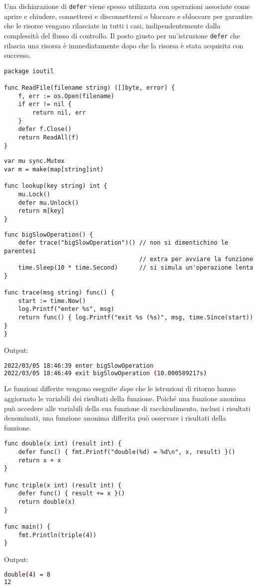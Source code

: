 \documentclass[../../thesis.tex]{subfiles}
\begin{document}
    Una dichiarazione di \verb"defer" viene spesso utilizzata con operazioni associate come aprire e chiudere, connettersi e disconnettersi o bloccare e sbloccare per garantire che le risorse vengano rilasciate in tutti i casi, indipendentemente dalla complessità del flusso di controllo.
    Il posto giusto per un'istruzione \verb"defer" che rilascia una risorsa è immediatamente dopo che la risorsa è stata acquisita con successo.
    \begin{lstlisting}[frame = single, label = {lst:lstlisting4-8.1}]
package ioutil

func ReadFile(filename string) ([]byte, error) {
    f, err := os.Open(filename)
    if err != nil {
        return nil, err
    }
    defer f.Close()
    return ReadAll(f)
}
    \end{lstlisting}
    \begin{lstlisting}[frame = single, label = {lst:lstlisting4-8.2}]
var mu sync.Mutex
var m = make(map[string]int)

func lookup(key string) int {
    mu.Lock()
    defer mu.Unlock()
    return m[key]
}
    \end{lstlisting}
    \begin{lstlisting}[frame = single, label = {lst:lstlisting4-8.3}]
func bigSlowOperation() {
    defer trace("bigSlowOperation")() // non si dimentichino le parentesi
                                      // extra per avviare la funzione
    time.Sleep(10 * time.Second)      // si simula un'operazione lenta
}

func trace(msg string) func() {
    start := time.Now()
    log.Printf("enter %s", msg)
    return func() { log.Printf("exit %s (%s)", msg, time.Since(start)) }
}
    \end{lstlisting}
    Output:
    \begin{lstlisting}[language = bash, frame = L, label = {lst:lstlisting4-8.4}]
2022/03/05 18:46:39 enter bigSlowOperation
2022/03/05 18:46:49 exit bigSlowOperation (10.000589217s)
    \end{lstlisting}
    Le funzioni differite vengono eseguite \textit{dopo} che le istruzioni di ritorno hanno aggiornato le variabili dei risultati della funzione.
    Poiché una funzione anonima può accedere alle variabili della sua funzione di racchiudimento, inclusi i risultati denominati, una funzione anonima differita può osservare i risultati della funzione.
    \begin{lstlisting}[frame = single, label = {lst:lstlisting4-8.5}]
func double(x int) (result int) {
    defer func() { fmt.Printf("double(%d) = %d\n", x, result) }()
    return x + x
}

func triple(x int) (result int) {
    defer func() { result += x }()
    return double(x)
}

func main() {
    fmt.Println(triple(4))
}
    \end{lstlisting}
    Output:
    \begin{lstlisting}[language = bash, frame = L, label = {lst:lstlisting4-8.6}]
double(4) = 8
12
    \end{lstlisting}
\end{document}
